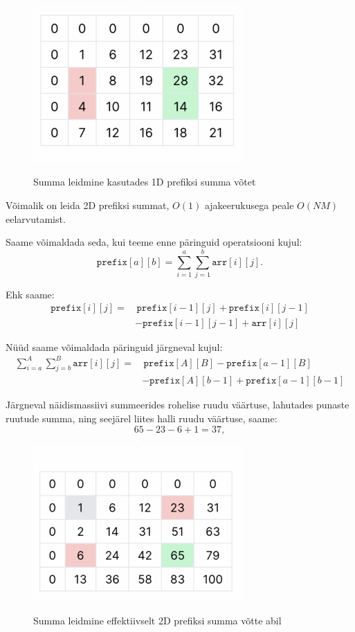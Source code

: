 \documentclass{trkut}
\begin{document}
\begin{appendices}
\begin{figure}[H]%
    \includegraphics[width=8cm]{pr2.png}%
    \caption{Summa leidmine kasutades 1D prefiksi summa võtet}%
    \label{EMaxx}%
\end{figure}

Võimalik on leida 2D prefiksi summat, $O(1)$ ajakeerukusega peale $O(NM)$ eelarvutamist.


Saame võimaldada seda, kui teeme enne päringuid operatsiooni kujul:
$$
\texttt{prefix}[a][b]=\sum_{i=1}^{a} \sum_{j=1}^{b} \texttt{arr}[i][j].
$$

Ehk saame:
$$
\begin{aligned}
\texttt{prefix}[i][j] =& \, \texttt{prefix}[i-1][j]+ \texttt{prefix}[i][j-1] \\
	&- \texttt{prefix}[i-1][j-1]+ \texttt{arr}[i][j]
\end{aligned}
$$

Nüüd saame võimaldada päringuid järgneval kujul:
$$
\begin{aligned}
\sum_{i=a}^{A} \sum_{j=b}^{B} \texttt{arr}[i][j]=&\,\texttt{prefix}[A][B]
		- \texttt{prefix}[a-1][B] \\
		&- \texttt{prefix}[A][b-1] + \texttt{prefix}[a-1][b-1]
\end{aligned}
$$


Järgneval näidismassiivi summeerides rohelise ruudu väärtuse, lahutades punaste ruutude summa, ning seejärel liites halli ruudu väärtuse, saame:
$$
65-23-6+1 = 37,
$$
\begin{figure}[H]%
    \includegraphics[width=8cm]{pr3.png}%
    \caption{Summa leidmine effektiivselt 2D prefiksi summa võtte abil}%
    \label{EMaxx}%
\end{figure}


\end{appendices}
\end{document}
